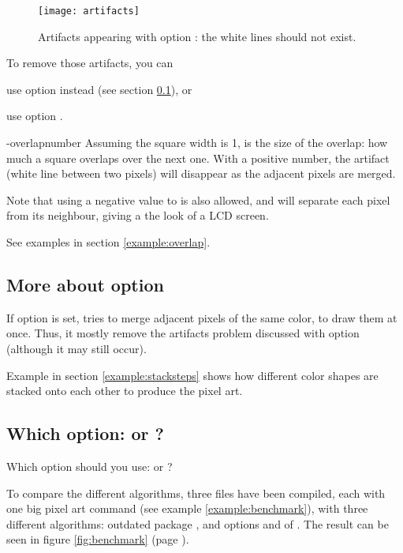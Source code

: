 \documentclass[
  load-preamble-,
  babel-options=english,
  add-index=true,
]{cnltx-doc}
\begin{document}
\begin{figure}
  \centering
  \texttt{[image: artifacts]}
  \caption{Artifacts appearing with option  : the white lines should not exist.}
  \label{fig:artifact}
\end{figure}

To remove those artifacts, you can
\begin{enumerate*}[label={(\arabic*)}]
  \item use option  instead (see section \ref{sec:stack}), or
  \item use option .
\end{enumerate*}

\begin{options}
  \keyval-{overlap}{number} Assuming the square width is 1,  is the size of the overlap: how much a square overlaps over the next one. With a positive number, the artifact (white line between two pixels) will disappear as the adjacent pixels are merged.

  Note that using a negative value to  is also allowed, and will separate each pixel from its neighbour, giving a the look of a LCD screen.

  See examples in section \ref{example:overlap}.
\end{options}

\subsection{More about option }
\label{sec:stack}

If option  is set,  tries to merge adjacent pixels of the same color, to draw them at once. Thus, it mostly remove the artifacts problem discussed with option  (although it may still occur).

Example in section \ref{example:stacksteps} shows how different color shapes are stacked onto each other to produce the pixel art.

\subsection{Which option:  or ?}
\label{sec:squaresstack}

Which option should you use:  or ?

To compare the different algorithms, three files have been compiled, each with one big pixel art command (see example \ref{example:benchmark}), with three different algorithms: outdated package , and options  and  of . The result can be seen in figure \ref{fig:benchmark} (page \pageref{fig:benchmark}).
\end{document}
